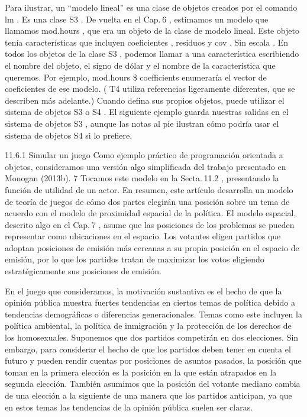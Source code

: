 \documentclass[
]{book}
\begin{document}
Para ilustrar, un ``modelo lineal'' es una clase de objetos creados por el comando lm . Es una clase S3 . De vuelta en el Cap. 6 , estimamos un modelo que llamamos mod.hours , que era un objeto de la clase de modelo lineal. Este objeto tenía características que incluyen coeficientes , residuos y cov . Sin escala . En todos los objetos de la clase S3 , podemos llamar a una característica escribiendo el nombre del objeto, el signo de dólar y el nombre de la característica que queremos. Por ejemplo, mod.hours \$ coefficients enumeraría el vector de coeficientes de ese modelo. ( T4 utiliza referencias ligeramente diferentes, que se describen más adelante.) Cuando defina sus propios objetos, puede utilizar el sistema de objetos S3 o S4 . El siguiente ejemplo guarda nuestras salidas en el sistema de objetos S3 , aunque las notas al pie ilustran cómo podría usar el sistema de objetos S4 si lo prefiere.

11.6.1 Simular un juego
Como ejemplo práctico de programación orientada a objetos, consideramos una versión algo simplificada del trabajo presentado en Monogan (2013b). 7 Tocamos este modelo en la Secta. 11.2 , presentando la función de utilidad de un actor. En resumen, este artículo desarrolla un modelo de teoría de juegos de cómo dos partes elegirán una posición sobre un tema de acuerdo con el modelo de proximidad espacial de la política. El modelo espacial, descrito algo en el Cap. 7 , asume que las posiciones de los problemas se pueden representar como ubicaciones en el espacio. Los votantes eligen partidos que adoptan posiciones de emisión más cercanas a su propia posición en el espacio de emisión, por lo que los partidos tratan de maximizar los votos eligiendo estratégicamente sus posiciones de emisión.

En el juego que consideramos, la motivación sustantiva es el hecho de que la opinión pública muestra fuertes tendencias en ciertos temas de política debido a tendencias demográficas o diferencias generacionales. Temas como este incluyen la política ambiental, la política de inmigración y la protección de los derechos de los homosexuales. Suponemos que dos partidos competirán en dos elecciones. Sin embargo, para considerar el hecho de que los partidos deben tener en cuenta el futuro y pueden rendir cuentas por posiciones de asuntos pasados, la posición que toman en la primera elección es la posición en la que están atrapados en la segunda elección. También asumimos que la posición del votante mediano cambia de una elección a la siguiente de una manera que los partidos anticipan, ya que en estos temas las tendencias de la opinión pública suelen ser claras.
\end{document}
